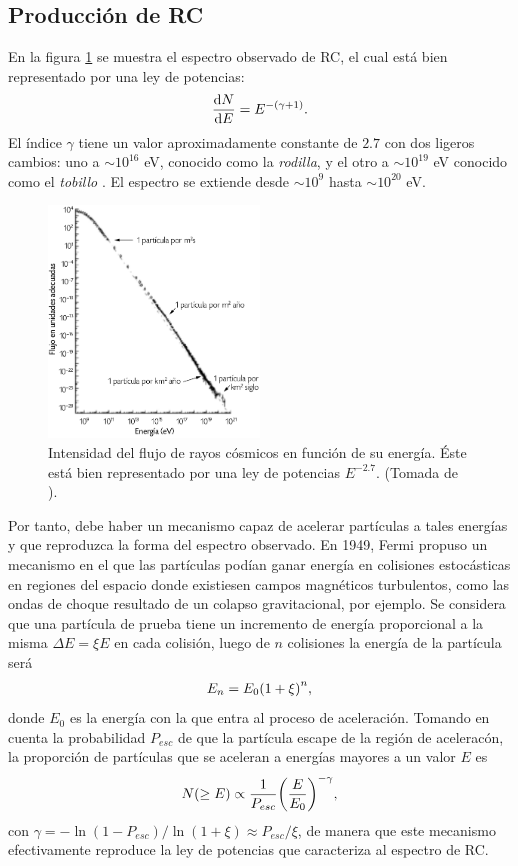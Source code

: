 	\subsection{Producción de RC}		
	En la figura \ref{fig:espectro} se muestra el espectro observado de RC, el cual está bien representado por una ley de potencias:
	\begin{align}
	\dv{N}{E}=E^{-(\gamma+1)}.
	\end{align}	
	El índice $\gamma$ tiene un valor aproximadamente constante de $2.7$ con dos ligeros cambios: uno a $\sim 10^{16}$ eV, conocido como la \textit{rodilla}, y el otro a $\sim 10^{19}$ eV conocido como el \textit{tobillo} \cite{Extremas}. El espectro se extiende desde  $\sim 10^9$ hasta $\sim 10^{20}$ eV.
	
	\begin{figure}[h]
	\centering	
	\includegraphics[width=0.5\textwidth]{Figuras/espectro_RC} 
	\caption{Intensidad del flujo de rayos cósmicos en función de su energía. Éste está bien representado por una ley de potencias $E^{-2.7}$. (Tomada de \cite{Poderosas}).}
	\label{fig:espectro}
	\end{figure}	

	Por tanto, debe haber un mecanismo capaz de acelerar partículas a tales energías y que reproduzca la forma del espectro observado. En 1949, Fermi propuso un mecanismo en el que las partículas podían ganar energía en colisiones estocásticas en regiones del espacio donde existiesen campos magnéticos turbulentos, como las ondas de choque resultado de un colapso gravitacional, por ejemplo. Se considera que una partícula de prueba tiene un incremento de energía proporcional a la misma $\Delta E = \xi E$ en cada colisión, luego de $n$ colisiones la energía de la partícula será \cite{Gaisser1990}
	\begin{align}
	E_n = E_0 \qty(1+\xi)^n,
	\end{align}
donde $E_0$ es la energía con la que entra al proceso de aceleración. Tomando en cuenta la probabilidad $P_{esc}$ de que la partícula escape de la región de aceleracón, la proporción de partículas que se aceleran a energías mayores a un valor $E$ es
	\begin{align}
	N(\geq E) \propto \frac{1}{P_{esc}}\qty(\frac{E}{E_0})^{-\gamma},
	\end{align}
	con $\gamma = -\ln(1-P_{esc})/\ln(1+\xi) \approx P_{esc}/\xi$, de manera que este mecanismo efectivamente reproduce la ley de potencias que caracteriza al espectro de RC. \\
	
